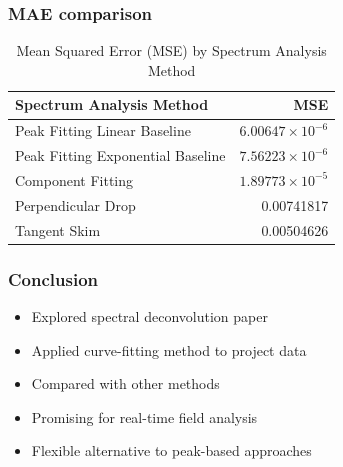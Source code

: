 \documentclass[xcolor=dvipsnames,envcountsect]{beamer}
\begin{document}
\begin{frame}
  \frametitle{MAE comparison}
  \begin{table}[h!]
    \centering
    \begin{tabular}{|l|r|}
    \hline
    \textbf{Spectrum Analysis Method} & \textbf{MSE} \\
    \hline
    Peak Fitting Linear Baseline     & \(6.00647 \times 10^{-6}\) \\
    Peak Fitting Exponential Baseline & \(7.56223 \times 10^{-6}\) \\
    Component Fitting                  & \(1.89773 \times 10^{-5}\) \\
    Perpendicular Drop                 & 0.00741817 \\
    Tangent Skim                       & 0.00504626 \\
    \hline
    \end{tabular}
    \caption{Mean Squared Error (MSE) by Spectrum Analysis Method}
    \label{tab:spectrum-analysis} 
  \end{table}
\end{frame}


\begin{frame}
  \frametitle{Conclusion}
  \begin{itemize}
    \item Explored spectral deconvolution paper
    \item Applied curve-fitting method to project data
    \item Compared with other methods
    \item Promising for real-time field analysis
    \item Flexible alternative to peak-based approaches
  \end{itemize}
\end{frame}
\end{document}
